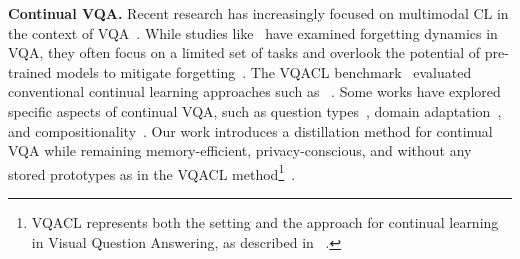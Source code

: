 \noindent \textbf{Continual VQA.} Recent research has increasingly focused on multimodal CL in the context of VQA~\citep{del2020ratt, greco2019psycholinguistics, nikandrou2022task, srinivasan2022climb}. While studies like~\citet{greco2019psycholinguistics} have examined forgetting dynamics in VQA, they often focus on a limited set of tasks and overlook the potential of pre-trained models to mitigate forgetting~\citep{mehta2021empirical}. The VQACL benchmark~\citep{zhang2023vqacl} evaluated conventional continual learning approaches such as ~\citep{chaudhry2019tinyepisodicmemoriescontinual, Chaudhry2019er, Wan_2022_CVPR, zhang2023vqacl}. Some works have explored specific aspects of continual VQA, such as question types~\citep{greco2019psycholinguistics}, domain adaptation~\citep{zhang-etal-2022-continual}, and compositionality~\citep{zhang2023vqacl}. Our work introduces a distillation method for continual VQA while remaining memory-efficient, privacy-conscious, and without any stored prototypes as in the VQACL method\footnote{VQACL represents both the setting and the approach for continual learning in Visual Question Answering, as described in ~\citep{zhang2023vqacl}.}~\citep{zhang2023vqacl}.